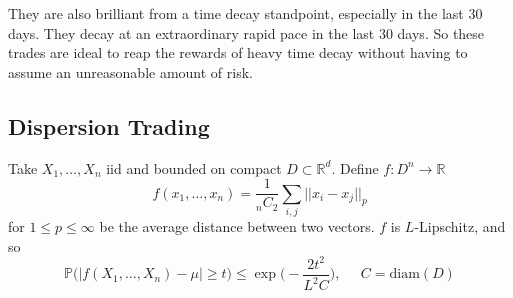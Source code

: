 \documentclass{article}
\begin{document}
They are also brilliant from a time decay standpoint, especially in the last 30 days. They decay at an extraordinary rapid pace in the last 30 days. So these trades are ideal to reap the rewards of heavy time decay without having to assume an unreasonable amount of risk. 

\subsection{Dispersion Trading}

Take $X_1, \ldots, X_n$ iid and bounded on compact $D \subset \mathbb{R}^d$. Define $f: D^n \rightarrow \mathbb{R}$
\[f(x_1, \ldots, x_n) = \frac{1}{_n C_2} \sum_{i, j} ||x_i - x_j||_p\]
for $1 \leq p \leq \infty$ be the average distance between two vectors. $f$ is $L$-Lipschitz, and so 
\[\mathbb{P} \big( |f(X_1, \ldots, X_n) - \mu| \geq t \big) \leq \exp \bigg( - \frac{2t^2}{L^2 C} \bigg), \;\;\;\;\; C = \mathrm{diam}(D)\]
\end{document}
